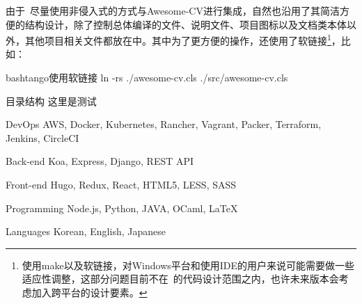 \begin{cvparagraph}
由于\dk~尽量使用非侵入式的方式与Awesome-CV进行集成，自然也沿用了其简洁方便的结构设计，除了控制总体编译的文件、说明文件、项目图标以及文档类本体以外，其他项目相关文件都放在中。其中为了更方便的操作，还使用了软链接\footnote{使用make以及软链接，对Windows平台和使用IDE的用户来说可能需要做一些适应性调整，这部分问题目前不在\dk~的代码设计范围之内，也许未来版本会考虑加入跨平台的设计要素。}，比如：

\begin{dkcode}{bash}{tango}{使用软链接}
ln -rs ./awesome-cv.cls ./src/awesome-cv.cls
\end{dkcode}

\end{cvparagraph}

\begin{dkcomment}{目录结构}{\faFolder}
这里是测试
\end{dkcomment}

\begin{cvskills}

  \cvskill
    {DevOps} %
    {AWS, Docker, Kubernetes, Rancher, Vagrant, Packer, Terraform, Jenkins, CircleCI} %

  \cvskill
    {Back-end} %
    {Koa, Express, Django, REST API} %

  \cvskill
    {Front-end} %
    {Hugo, Redux, React, HTML5, LESS, SASS} %

  \cvskill
    {Programming} %
    {Node.js, Python, JAVA, OCaml, LaTeX} %

  \cvskill
    {Languages} %
    {Korean, English, Japanese} %

\end{cvskills}

\clearpage

